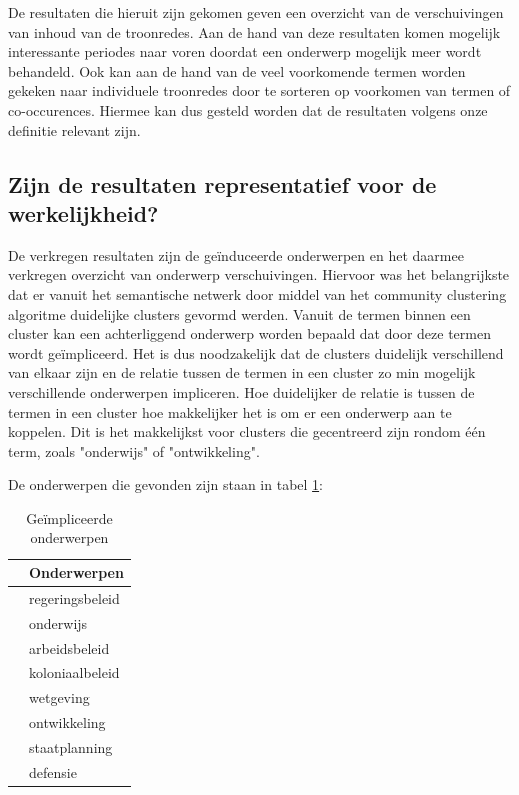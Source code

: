 De resultaten die hieruit zijn gekomen geven een overzicht van de verschuivingen van inhoud van de troonredes. Aan de hand van deze resultaten komen mogelijk interessante periodes naar voren doordat een onderwerp mogelijk meer wordt behandeld. Ook kan aan de hand van de veel voorkomende termen worden gekeken naar individuele troonredes door te sorteren op voorkomen van termen of co-occurences. Hiermee kan dus gesteld worden dat de resultaten volgens onze definitie relevant zijn. 

\subsection{Zijn de resultaten representatief voor de werkelijkheid?}

De verkregen resultaten zijn de geïnduceerde onderwerpen en het daarmee verkregen overzicht van onderwerp verschuivingen. Hiervoor was het belangrijkste dat er vanuit het semantische netwerk door middel van het community clustering algoritme duidelijke clusters gevormd werden. Vanuit de termen binnen een cluster kan een achterliggend onderwerp worden bepaald dat door deze termen wordt geïmpliceerd. Het is dus noodzakelijk dat de clusters duidelijk verschillend van elkaar zijn en de relatie tussen de termen in een cluster zo min mogelijk verschillende onderwerpen impliceren. Hoe duidelijker de relatie is tussen de termen in een cluster hoe makkelijker het is om er een onderwerp aan te koppelen. Dit is het makkelijkst voor clusters die gecentreerd zijn rondom één term, zoals "onderwijs" of "ontwikkeling". 

De onderwerpen die gevonden zijn staan in tabel \ref{onderwerpen}:
\begin{table}[H]
\centering
\begin{tabular}{ll}
\toprule
{} &                Onderwerpen \\
\midrule
 &  regeringsbeleid \\
 &        onderwijs \\
 &    arbeidsbeleid \\
 &  koloniaalbeleid \\
 &        wetgeving \\
 &     ontwikkeling \\
 &    staatplanning \\
 &         defensie \\
\bottomrule
\end{tabular}
\caption{Geïmpliceerde onderwerpen}
\label{onderwerpen}
\end{table}

